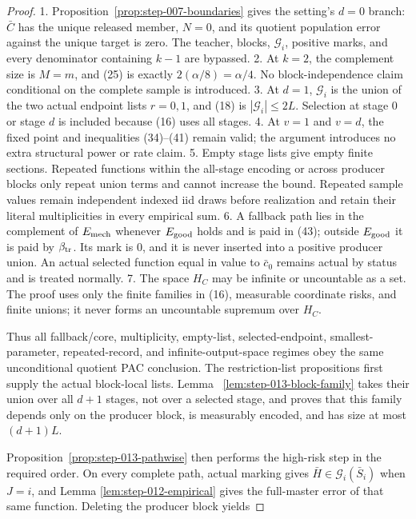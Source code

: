 \begin{proof}
1. Proposition~\ref{prop:step-007-boundaries} gives the setting's
   \(d=0\) branch: \(\bar C\) has the unique released member, \(N=0\), and
   its quotient population error against the unique target is zero. The
   teacher, blocks, \(\mathcal G_i\), positive marks, and every denominator
   containing \(k-1\) are bypassed.
2. At \(k=2\), the complement size is \(M=m\), and (25) is exactly
   \(2(\alpha/8)=\alpha/4\). No block-independence claim conditional on the
   complete sample is introduced.
3. At \(d=1\), \(\mathcal G_i\) is the union of the two actual endpoint
   lists \(r=0,1\), and (18) is \(|\mathcal G_i|\leq2L\). Selection at
   stage \(0\) or stage \(d\) is included because (16) uses all stages.
4. At \(v=1\) and \(v=d\), the  fixed point and inequalities
   (34)--(41) remain valid; the argument introduces no extra structural power
   or rate claim.
5. Empty stage lists give empty finite sections. Repeated functions within
   the all-stage encoding or across producer blocks only repeat union terms
   and cannot increase the bound. Repeated sample values remain independent
   indexed iid draws before realization and retain their literal
   multiplicities in every empirical sum.
6. A fallback path lies in the complement of \(E_{\rm mech}\) whenever
   \(E_{\rm good}\) holds and is paid in (43); outside
   \(E_{\rm good}\) it is paid by \(\beta_{\rm tr}\). Its mark is \(0\),
   and it is never inserted into a positive producer union. An actual
   selected function equal in value to \(\bar c_0\) remains actual by
   status and is treated normally.
7. The space \(H_C\) may be infinite or uncountable as a set. The proof
   uses only the finite families in (16), measurable coordinate risks, and
   finite unions; it never forms an uncountable supremum over \(H_C\).

Thus all fallback/core, multiplicity, empty-list, selected-endpoint,
smallest-parameter, repeated-record, and infinite-output-space regimes obey
the same unconditional quotient PAC conclusion. 
The restriction-list propositions first supply the actual block-local lists.
Lemma
~\ref{lem:step-013-block-family} takes their union over all \(d+1\) stages,
not over a selected stage, and proves that this family depends only on the
producer block, is measurably encoded, and has size at most \((d+1)L\).

Proposition~\ref{prop:step-013-pathwise} then performs the high-risk step in
the required order. On every complete path,  actual marking gives
\(\bar H\in\mathcal G_i(\bar S_i)\) when \(J=i\), and Lemma
\ref{lem:step-012-empirical} gives the full-master error of that same
function. Deleting the producer
block yields


\end{proof}

